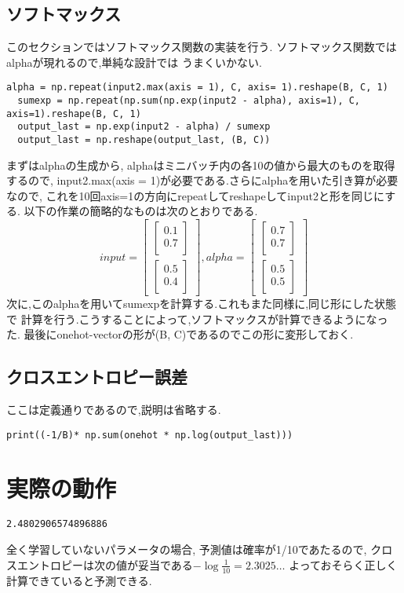 \documentclass[a4paper,11pt]{jsarticle}
\begin{document}
\subsection*{ソフトマックス}
このセクションではソフトマックス関数の実装を行う.
ソフトマックス関数ではalphaが現れるので,単純な設計では
うまくいかない.
\begin{lstlisting}[caption=SoftMax]
  alpha = np.repeat(input2.max(axis = 1), C, axis= 1).reshape(B, C, 1)
  sumexp = np.repeat(np.sum(np.exp(input2 - alpha), axis=1), C, axis=1).reshape(B, C, 1)
  output_last = np.exp(input2 - alpha) / sumexp
  output_last = np.reshape(output_last, (B, C))
\end{lstlisting}
まずはalphaの生成から, alphaはミニバッチ内の各10の値から最大のものを取得するので,
input2.max(axis = 1)が必要である.さらにalphaを用いた引き算が必要なので, 
これを10回axis=1の方向にrepeatしてreshapeしてinput2と形を同じにする.
以下の作業の簡略的なものは次のとおりである.
$$
input = \begin{bmatrix}
  \begin{bmatrix}
    0.1 \\
    0.7 \\
  \end{bmatrix} \\
  \begin{bmatrix}
    0.5 \\
    0.4 \\
  \end{bmatrix}
\end{bmatrix}, alpha = \begin{bmatrix}
  \begin{bmatrix}
    0.7 \\
    0.7 \\
  \end{bmatrix} \\
  \begin{bmatrix}
    0.5 \\
    0.5 \\
  \end{bmatrix}
\end{bmatrix}
$$
次に,このalphaを用いてsumexpを計算する.これもまた同様に,同じ形にした状態で
計算を行う.こうすることによって,ソフトマックスが計算できるようになった.
最後にonehot-vectorの形が(B, C)であるのでこの形に変形しておく.

\subsection*{クロスエントロピー誤差}
ここは定義通りであるので,説明は省略する.
\begin{lstlisting}[caption=CrossEntropy]
  print((-1/B)* np.sum(onehot * np.log(output_last)))
\end{lstlisting}

\section{実際の動作}
\begin{lstlisting}[caption=Actual Move]
  2.4802906574896886
\end{lstlisting}
全く学習していないパラメータの場合, 予測値は確率が1/10であたるので,
クロスエントロピーは次の値が妥当である$-\log{\frac{1}{10}} = 2.3025\dots$
よっておそらく正しく計算できていると予測できる.
\end{document}
